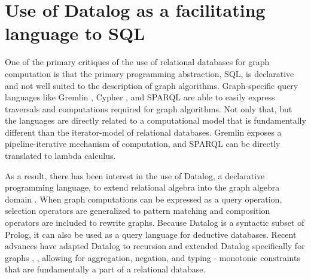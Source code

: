 \documentclass[11pt,letterpaper]{article}
\begin{document}
%

\section*{Use of Datalog as a facilitating language to SQL}

One of the primary critiques of the use of relational databases for graph computation is that the primary programming abstraction, SQL, is declarative and not well suited to the description of graph algorithms. Graph-specific query languages like Gremlin \cite{rodriguez_gremlin_2013}, Cypher \cite{miller_graph_2013}, and SPARQL \cite{prudhommeaux_sparql_2008} are able to easily express traversals and computations required for graph algorithms. Not only that, but the languages are directly related to a computational model that is fundamentally different than the iterator-model of relational databases. Gremlin exposes a pipeline-iterative mechanism of computation, and SPARQL can be directly translated to lambda calculus.

As a result, there has been interest in the use of Datalog, a declarative programming language, to extend relational algebra into the graph algebra domain \cite{he_graphs-at--time:_2008}. When graph computations can be expressed as a query operation, selection operators are generalized to pattern matching and composition operators are included to rewrite graphs. Because Datalog is a syntactic subset of Prolog, it can also be used as a query language for deductive databases. Recent advances have adapted Datalog to recursion and extended Datalog specifically for graphs \cite{shkapsky_graph_2013}, \cite{green_datalog_2013}, allowing for aggregation, negation, and typing - monotonic constraints that are fundamentally a part of a relational database.
\end{document}
